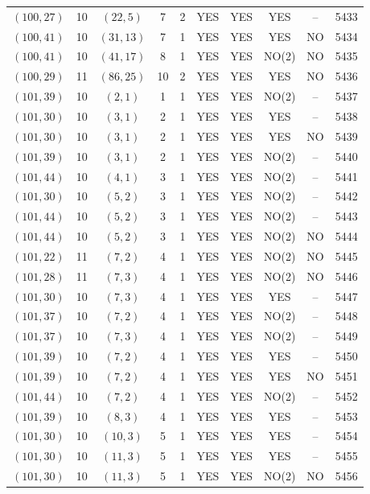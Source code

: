 \begin{longtable}{|c|c|c|c|c|c|c|c|c|c|}
$(100, 27)$ & 10 & $(22, 5)$ & 7 & 2 & YES & YES & YES & -- & 5433\\
$(100, 41)$ & 10 & $(31, 13)$ & 7 & 1 & YES & YES & YES & NO & 5434\\
$(100, 41)$ & 10 & $(41, 17)$ & 8 & 1 & YES & YES & NO(2) & NO & 5435\\
$(100, 29)$ & 11 & $(86, 25)$ & 10 & 2 & YES & YES & YES & NO & 5436\\
$(101, 39)$ & 10 & $(2, 1)$ & 1 & 1 & YES & YES & NO(2) & -- & 5437\\
$(101, 30)$ & 10 & $(3, 1)$ & 2 & 1 & YES & YES & YES & -- & 5438\\
$(101, 30)$ & 10 & $(3, 1)$ & 2 & 1 & YES & YES & YES & NO & 5439\\
$(101, 39)$ & 10 & $(3, 1)$ & 2 & 1 & YES & YES & NO(2) & -- & 5440\\
$(101, 44)$ & 10 & $(4, 1)$ & 3 & 1 & YES & YES & NO(2) & -- & 5441\\
$(101, 30)$ & 10 & $(5, 2)$ & 3 & 1 & YES & YES & NO(2) & -- & 5442\\
$(101, 44)$ & 10 & $(5, 2)$ & 3 & 1 & YES & YES & NO(2) & -- & 5443\\
$(101, 44)$ & 10 & $(5, 2)$ & 3 & 1 & YES & YES & NO(2) & NO & 5444\\
$(101, 22)$ & 11 & $(7, 2)$ & 4 & 1 & YES & YES & NO(2) & NO & 5445\\
$(101, 28)$ & 11 & $(7, 3)$ & 4 & 1 & YES & YES & NO(2) & NO & 5446\\
$(101, 30)$ & 10 & $(7, 3)$ & 4 & 1 & YES & YES & YES & -- & 5447\\
$(101, 37)$ & 10 & $(7, 2)$ & 4 & 1 & YES & YES & NO(2) & -- & 5448\\
$(101, 37)$ & 10 & $(7, 3)$ & 4 & 1 & YES & YES & NO(2) & -- & 5449\\
$(101, 39)$ & 10 & $(7, 2)$ & 4 & 1 & YES & YES & YES & -- & 5450\\
$(101, 39)$ & 10 & $(7, 2)$ & 4 & 1 & YES & YES & YES & NO & 5451\\
$(101, 44)$ & 10 & $(7, 2)$ & 4 & 1 & YES & YES & NO(2) & -- & 5452\\
$(101, 39)$ & 10 & $(8, 3)$ & 4 & 1 & YES & YES & YES & -- & 5453\\
$(101, 30)$ & 10 & $(10, 3)$ & 5 & 1 & YES & YES & YES & -- & 5454\\
$(101, 30)$ & 10 & $(11, 3)$ & 5 & 1 & YES & YES & YES & -- & 5455\\
$(101, 30)$ & 10 & $(11, 3)$ & 5 & 1 & YES & YES & NO(2) & NO & 5456\\

\end{longtable}
